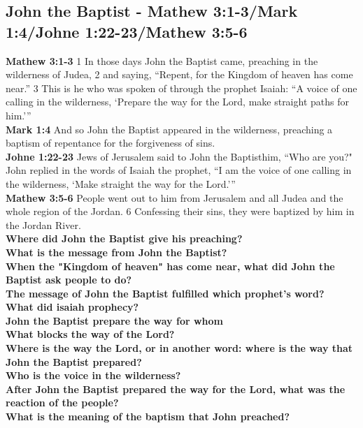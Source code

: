 \subsection{John the Baptist - Mathew 3:1-3/Mark 1:4/Johne 1:22-23/Mathew 3:5-6}
\textbf{Mathew 3:1-3} 1 In those days John the Baptist came, preaching in the wilderness of Judea, 2 and saying, “Repent, for the Kingdom of heaven has come near.” 3 This is he who was spoken of through the prophet Isaiah: “A voice of one calling in the wilderness, ‘Prepare the way for the Lord, make straight paths for him.’” \\
\textbf{Mark 1:4} And so John the Baptist appeared in the wilderness, preaching a baptism of repentance for the forgiveness of sins.\\
\textbf{Johne 1:22-23} Jews of Jerusalem said to John the Baptisthim, “Who are you?" John replied in the words of Isaiah the prophet, “I am the voice of one calling in the wilderness, ‘Make straight the way for the Lord.’”\\
\textbf{Mathew 3:5-6} People went out to him from Jerusalem and all Judea and the whole region of the Jordan. 6 Confessing their sins, they were baptized by him in the Jordan River.\\


\textbf{Where did John the Baptist give his preaching?}\\
\textbf{What is the message from John the Baptist?}\\
\textbf{When the "Kingdom of heaven" has come near, what did John the Baptist ask people to do?}\\
\textbf{The message of John the Baptist fulfilled which prophet's word?}\\
\textbf{What did isaiah prophecy?}\\
\textbf{John the Baptist prepare the way for whom}\\
\textbf{What blocks the way of the Lord?}\\
\textbf{Where is the way the Lord, or in another word: where is the way that John the Baptist prepared?}\\
\textbf{Who is the voice in the wilderness?}\\
\textbf{After John the Baptist prepared the way for the Lord, what was the reaction of the people?}\\
\textbf{What is the meaning of the baptism that John preached?}\\





